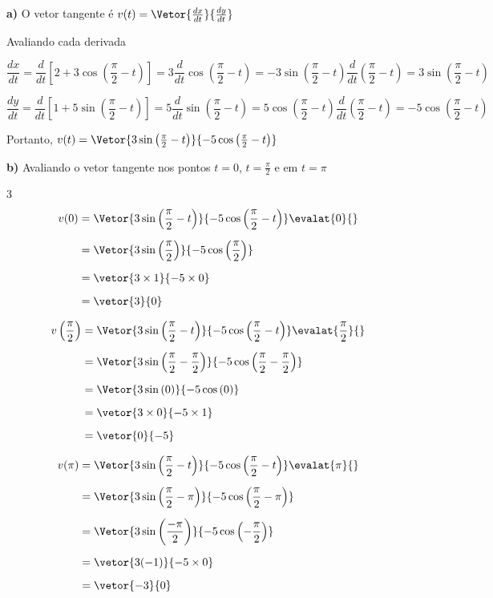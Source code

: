 \documentclass[a4paper,12pt,fleqn]{article}
\begin{document}
\begin{answer}
\textbf{a)} \quad
O vetor tangente é
\(
  v(t) = \Vetor{\frac{dx}{dt}}{\frac{dy}{dt}}
\)

Avaliando cada derivada

\medskip
\[
  \frac{dx}{dt}
  = \frac{d}{dt}\left[2 + 3 \cos\left(\frac{\pi}{2}-t\right)\right]
  = 3 \frac{d}{dt}\cos\left(\frac{\pi}{2}-t\right)
  = -3 \sin\left(\frac{\pi}{2}-t\right)\frac{d}{dt}\left(\frac{\pi}{2}-t\right)
  = 3 \sin\left(\frac{\pi}{2}-t\right)
\]

\medskip
\[
  \frac{dy}{dt}
  = \frac{d}{dt}\left[1 + 5 \sin\left(\frac{\pi}{2}-t\right)\right]
  = 5 \frac{d}{dt}\sin\left(\frac{\pi}{2}-t\right)
  = 5 \cos\left(\frac{\pi}{2}-t\right)\frac{d}{dt}\left(\frac{\pi}{2}-t\right)
  = -5 \cos\left(\frac{\pi}{2}-t\right)
\]

\medskip
Portanto,
\(
  v(t) = \Vetor{3 \sin\left(\frac{\pi}{2}-t\right)}{-5 \cos\left(\frac{\pi}{2}-t\right)}
\)

\clearpage
\textbf{b)} \quad
Avaliando o vetor tangente nos pontos $t=0$, $t=\frac{\pi}{2}$ e em $t=\pi$
\setlength{\mathindent}{0pt}
\begin{multicols}{3}
\begin{align*}
  v(0)
  & = \Vetor{3 \sin\left(\frac{\pi}{2}-t\right)}{-5 \cos\left(\frac{\pi}{2}-t\right)} \evalat{0}{} \\[2mm]
  & = \Vetor{3 \sin\left(\frac{\pi}{2}\right)}{-5 \cos\left(\frac{\pi}{2}\right)} \\[2mm]
  & = \vetor{3 \times 1}{-5 \times 0} \\[2mm]
  & = \vetor{3}{0}
\end{align*}

\newcolumn
\begin{align*}
  v\left(\frac{\pi}{2}\right)
  & = \Vetor{3 \sin\left(\frac{\pi}{2}-t\right)}{-5 \cos\left(\frac{\pi}{2}-t\right)} \evalat{\frac{\pi}{2}}{} \\[2mm]
  & = \Vetor{3 \sin\left(\frac{\pi}{2}-\frac{\pi}{2}\right)}{-5 \cos\left(\frac{\pi}{2}-\frac{\pi}{2}\right)} \\[2mm]
  & = \Vetor{3 \sin\left(0\right)}{-5 \cos\left(0\right)} \\[2mm]
  & = \vetor{3 \times 0}{-5 \times 1} \\[2mm]
  & = \vetor{0}{-5}
\end{align*}

\newcolumn
\begin{align*}
  v(\pi)
  & = \Vetor{3 \sin\left(\frac{\pi}{2}-t\right)}{-5 \cos\left(\frac{\pi}{2}-t\right)} \evalat{\pi}{} \\[2mm]
  & = \Vetor{3 \sin\left(\frac{\pi}{2}-\pi\right)}{-5 \cos\left(\frac{\pi}{2}-\pi\right)} \\[2mm]
  & = \Vetor{3 \sin\left(\frac{-\pi}{2}\right)}{-5 \cos\left(-\frac{\pi}{2}\right)} \\[2mm]
  & = \vetor{3(-1)}{-5 \times 0} \\[2mm]
  & = \vetor{-3}{0}
\end{align*}
\end{multicols}


\end{answer}
\end{document}

